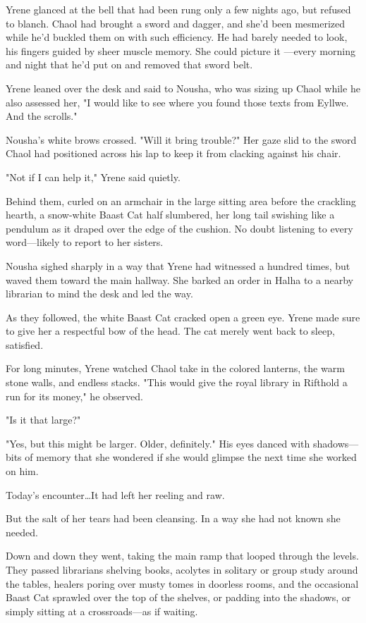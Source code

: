 Yrene glanced at the bell that had been rung only a few nights ago, but refused to blanch.
Chaol had brought a sword and dagger, and she'd been mesmerized while he'd buckled them on with such efficiency.
He had barely needed to look, his fingers guided by sheer muscle memory.
She could picture it ---every morning and night that he'd put on and removed that sword belt.

Yrene leaned over the desk and said to Nousha, who was sizing up Chaol while he also assessed her, "I would like to see where you found those texts from Eyllwe.
And the scrolls."

Nousha's white brows crossed.
"Will it bring trouble?"
Her gaze slid to the sword Chaol had positioned across his lap to keep it from clacking against his chair.

"Not if I can help it," Yrene said quietly.

Behind them, curled on an armchair in the large sitting area before the crackling hearth, a snow-white Baast Cat half slumbered, her long tail swishing like a pendulum as it draped over the edge of the cushion.
No doubt listening to every word---likely to report to her sisters.

Nousha sighed sharply in a way that Yrene had witnessed a hundred times, but waved them toward the main hallway.
She barked an order in Halha to a nearby librarian to mind the desk and led the way.

As they followed, the white Baast Cat cracked open a green eye.
Yrene made sure to give her a respectful bow of the head.
The cat merely went back to sleep, satisfied.

For long minutes, Yrene watched Chaol take in the colored lanterns, the warm stone walls, and endless stacks.
"This would give the royal library in Rifthold a run for its money," he observed.

"Is it that large?"

"Yes, but this might be larger.
Older, definitely."
His eyes danced with shadows---bits of memory that she wondered if she would glimpse the next time she worked on him.

Today's encounter\ldots It had left her reeling and raw.

But the salt of her tears had been cleansing.
In a way she had not known she needed.

Down and down they went, taking the main ramp that looped through the levels.
They passed librarians shelving books, acolytes in solitary or group study around the tables, healers poring over musty tomes in doorless rooms, and the occasional Baast Cat sprawled over the top of the shelves, or padding into the shadows, or simply sitting at a crossroads---as if waiting.


